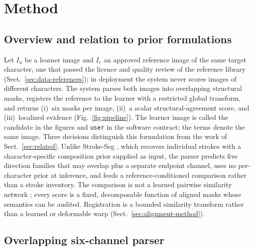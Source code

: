 \section{Method}
\label{sec:method}

\subsection{Overview and relation to prior formulations}

Let \(I_u\) be a learner image and \(I_r\) an approved reference image of
the same target character, one that passed the licence and quality review
of the reference library (Sect.~\ref{sec:data-references}); in deployment the system never scores images of different characters. The system parses both images into overlapping
structural masks, registers the reference to the learner with a restricted
global transform, and returns (i)~six masks per image, (ii)~a scalar
structural-agreement score, and (iii)~localized evidence
(Fig.~\ref{fig:pipeline}). The learner image is called the candidate in the
figures and \texttt{user} in the software contract; the terms denote the
same image. Three decisions distinguish this
formulation from the work of Sect.~\ref{sec:related}. Unlike Stroke-Seg
\cite{gong2024strokeseg}, which recovers individual strokes with a
character-specific composition prior supplied as input, the parser predicts
five direction families that may overlap plus a separate endpoint channel,
uses no per-character prior at inference, and feeds a reference-conditioned
comparison rather than a stroke inventory. The comparison is not a learned
pairwise similarity network \cite{chen2025siamhcc}; every score is a fixed,
decomposable function of aligned masks whose semantics can be audited.
Registration is a bounded similarity transform rather than a learned or
deformable warp \cite{jaderberg2015stn,zitova2003registration}
(Sect.~\ref{sec:alignment-method}).

\subsection{Overlapping six-channel parser}
\label{sec:parser}

